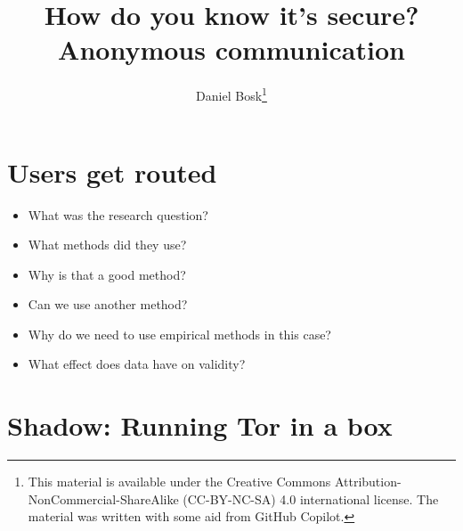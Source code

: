\title{%
  How do you know it's secure?
  Anonymous communication
}
\author{Daniel Bosk\thanks{%
    This material is available under the Creative Commons 
    Attribution-NonCommercial-ShareAlike (CC-BY-NC-SA) 4.0 international 
    license.
    The material was written with some aid from GitHub Copilot.
}}

\begin{frame}
  \maketitle
\end{frame}

\mode*

\begin{abstract}
  
\end{abstract}

\clearpage

\section{Users get routed}

\begin{frame}
  \begin{question}
    \begin{itemize}
      \item What was the research question?
      \item What methods did they use?
      \item Why is that a good method?
      \item Can we use another method?
    \end{itemize}
  \end{question}
\end{frame}

\begin{frame}
  \begin{question}
    \begin{itemize}
      \item Why do we need to use empirical methods in this case?
      \item What effect does data have on validity?
    \end{itemize}
  \end{question}
\end{frame}

\section{Shadow: Running Tor in a box}

